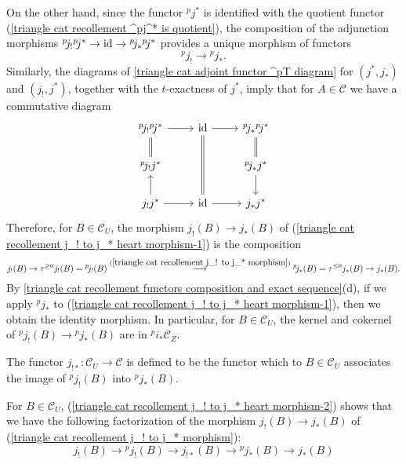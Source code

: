 On the other hand, since the functor ${^p\!j^*}$ is identified with the quotient functor (\cref{triangle cat recollement ^pj^* is quotient}), the composition of the adjunction morphisms ${^p\!j_!}{^p\!j^*}\to\operatorname{id}\to{^p\!j_*}{^p\!j^*}$ provides a unique morphism of functors
\begin{equation}\label{triangle cat recollement j_! to j_* heart morphism-1}
{^p\!j_!}\to{^p\!j_*}.
\end{equation}
Similarly, the diagrams of \cref{triangle cat adjoint functor ^pT diagram} for $(j^*,j_*)$ and $(j_!,j^*)$, together with the $t$-exactness of $j^*$, imply that for $A\in\mathcal{C}$ we have a commutative diagram
\[\begin{tikzcd}
{^p\!j_!}{^p\!j^*}\ar[r]\ar[d,equal]&\id\ar[dd,equal]\ar[r]&{^p\!j_*}{^p\!j^*}\ar[d,equal]\\
{^p\!j_!}j^*&&{^p\!j_*}j^*\ar[d]\\
j_!j^*\ar[r]\ar[u]&\id\ar[r]&j_*j^*
\end{tikzcd}\]
Therefore, for $B\in\mathcal{C}_U$, the morphism $j_!(B)\to j_*(B)$ of (\ref{triangle cat recollement j_! to j_* heart morphism-1}) is the composition
\begin{equation}\label{triangle cat recollement j_! to j_* heart morphism-2}
j_!(B)\to \tau^{\geq 0}j_!(B)={^p\!j_!}(B)\stackrel{(\ref{triangle cat recollement j_! to j_* morphism})}{\longrightarrow}{^p\!j_*}(B)=\tau^{\leq 0}j_*(B)\to j_*(B).
\end{equation}
By \cref{triangle cat recollement functors composition and exact sequence}(d), if we apply ${^p\!j_*}$ to (\ref{triangle cat recollement j_! to j_* heart morphism-1}), then we obtain the identity morphism. In particular, for $B\in\mathcal{C}_U$, the kernel and cokernel of ${^p\!j_!}(B)\to {^p\!j_*}(B)$ are in ${^p\!i_*}\mathcal{C}_Z$.

\begin{definition}
The functor $j_{!*}:\mathcal{C}_U\to\mathcal{C}$ is defined to be the functor which to $B\in\mathcal{C}_U$ associates the image of ${^p\!j_!}(B)$ into ${^p\!j_*}(B)$.
\end{definition}

For $B\in\mathcal{C}_U$, (\ref{triangle cat recollement j_! to j_* heart morphism-2}) shows that we have the following factorization of the morphism $j_!(B)\to j_*(B)$ of (\ref{triangle cat recollement j_! to j_* morphism}):
\begin{equation}\label{triangle cat recollement j_! to j_* heart morphism-3}
j_!(B)\to {^p\!j_!}(B)\to j_{!*}(B)\to {^p\!j_*}(B)\to j_*(B)
\end{equation}

